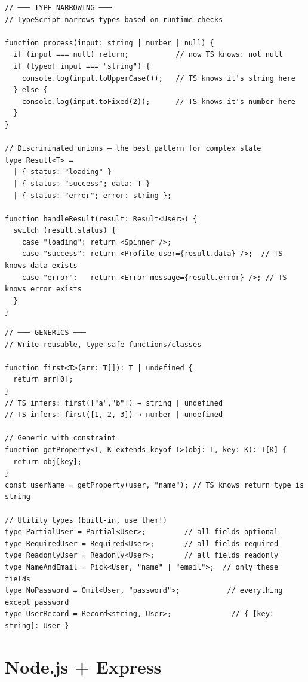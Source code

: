 \documentclass[10pt, a4paper]{article}
\begin{document}
\begin{lstlisting}[language=myjs]
// ─── TYPE NARROWING ───
// TypeScript narrows types based on runtime checks

function process(input: string | number | null) {
  if (input === null) return;           // now TS knows: not null
  if (typeof input === "string") {
    console.log(input.toUpperCase());   // TS knows it's string here
  } else {
    console.log(input.toFixed(2));      // TS knows it's number here
  }
}

// Discriminated unions — the best pattern for complex state
type Result<T> =
  | { status: "loading" }
  | { status: "success"; data: T }
  | { status: "error"; error: string };

function handleResult(result: Result<User>) {
  switch (result.status) {
    case "loading": return <Spinner />;
    case "success": return <Profile user={result.data} />;  // TS knows data exists
    case "error":   return <Error message={result.error} />; // TS knows error exists
  }
}
\end{lstlisting}


\begin{lstlisting}[language=myjs]
// ─── GENERICS ───
// Write reusable, type-safe functions/classes

function first<T>(arr: T[]): T | undefined {
  return arr[0];
}
// TS infers: first(["a","b"]) → string | undefined
// TS infers: first([1, 2, 3]) → number | undefined

// Generic with constraint
function getProperty<T, K extends keyof T>(obj: T, key: K): T[K] {
  return obj[key];
}
const userName = getProperty(user, "name"); // TS knows return type is string

// Utility types (built-in, use them!)
type PartialUser = Partial<User>;         // all fields optional
type RequiredUser = Required<User>;       // all fields required
type ReadonlyUser = Readonly<User>;       // all fields readonly
type NameAndEmail = Pick<User, "name" | "email">;  // only these fields
type NoPassword = Omit<User, "password">;           // everything except password
type UserRecord = Record<string, User>;              // { [key: string]: User }
\end{lstlisting}


\bigskip


\section{Node.js + Express}
\end{document}
